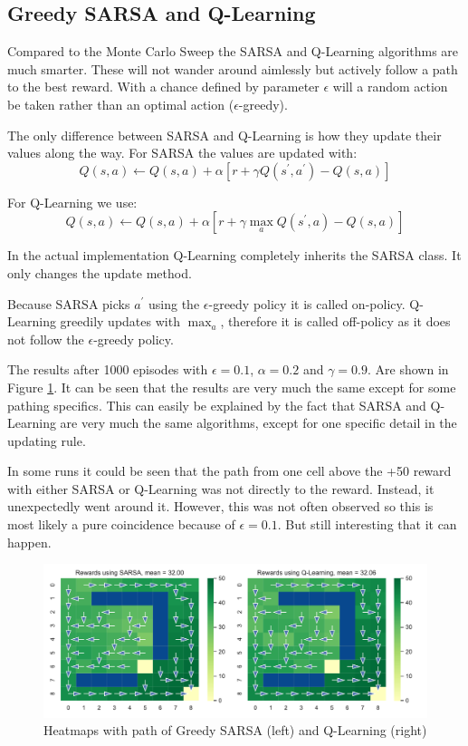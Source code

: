 \documentclass[]{scrartcl}
\begin{document}
\subsection{Greedy SARSA and Q-Learning}

Compared to the Monte Carlo Sweep the SARSA and Q-Learning algorithms are much smarter. These will not wander around aimlessly but actively follow a path to the best reward. With a chance defined by parameter $\epsilon$ will a random action be taken rather than an optimal action ($\epsilon$-greedy).

The only difference between SARSA and Q-Learning is how they update their values along the way. For SARSA the values are updated with:
$$Q(s, a) \leftarrow Q(s, a)+\alpha\left[r+\gamma Q\left(s^{\prime}, a^{\prime}\right)-Q(s, a)\right]$$

For Q-Learning we use:
$$Q(s, a) \leftarrow Q(s, a)+\alpha\left[r+\gamma \max_a Q\left(s^{\prime}, a\right)-Q(s, a)\right]$$

In the actual implementation Q-Learning completely inherits the SARSA class. It only changes the update method.

Because SARSA picks $a^\prime$ using the $\epsilon$-greedy policy it is called on-policy. Q-Learning greedily updates with $\max_a$, therefore it is called off-policy as it does not follow the $\epsilon$-greedy policy.

The results after 1000 episodes with $\epsilon = 0.1$, $\alpha = 0.2$ and $\gamma = 0.9$. Are shown in Figure \ref{fig:3-2}. It can be seen that the results are very much the same except for some pathing specifics. This can easily be explained by the fact that SARSA and Q-Learning are very much the same algorithms, except for one specific detail in the updating rule.

In some runs it could be seen that the path from one cell above the +50 reward with either SARSA or Q-Learning was not directly to the reward. Instead, it unexpectedly went around it. However, this was not often observed so this is most likely a pure coincidence because of $\epsilon=0.1$. But still interesting that it can happen.

\begin{figure}[H]
	\centering
	\includegraphics[width=0.8\linewidth]{3-2.pdf}
	\caption{Heatmaps with path of Greedy SARSA (left) and Q-Learning (right)}
	\label{fig:3-2}
\end{figure}
\end{document}
